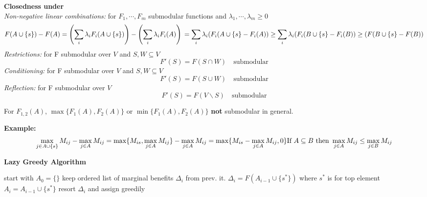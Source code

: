 \documentclass[10pt,parskip]{scrartcl}
\begin{document}
\begin{multicols*}{3}
\textbf{Closedness under}\\
\emph{Non-negative linear combinations: } for $F_1,\cdots,F_m$ submodular functions and $\lambda_1, \cdots, \lambda_m \geq 0$
\begingroup
    \fontsize{8pt}{8pt}\selectfont 
$$
F(A \cup \{ s \}) - F(A) = \left(\sum_i \lambda_i F_i(A \cup \{s\}) \right) - \left( \sum_i \lambda_i F_i(A)  \right) \\
 = \sum_i \lambda_i (F_i(A \cup \{s\} - F_i(A)) \geq \sum_i \lambda_i (F_i(B \cup \{s\} - F_i(B)) \\
\geq (F(B \cup \{s\} - F(B))
$$
\endgroup
\emph{Restrictions: } for F submodular over $V$ and $S,W \subseteq V$
$$
F'(S) = F(S \cap W) \quad \textrm{submodular}
$$
\emph{Conditioning: } for F submodular over $V$ and $S,W \subseteq V$
$$
F'(S) = F(S \cup W) \quad \textrm{submodular}
$$
\emph{Reflection: } for F submodular over $V$
$$
F'(S) = F(V \backslash S) \quad \textrm{submodular}
$$
\begin{mdframed}
	For $F_{1,2}(A)$, $\max \{F_1(A),F_2(A) \}$ or $\min \{F_1(A),F_2(A) \}$ \textbf{not} submodular in general.
\end{mdframed}

\textbf{Example: }
\begingroup
    \fontsize{8pt}{8pt}\selectfont 
$$
\max_{j\in A \cup \{s\}} M_{ij} - \max_{j\in A} M_{ij} = \max \{M_{is},\max_{j\in A} M_{ij} \} - \max_{j \in A} M_{ij} \\
= \max \{ M_{is} - \max_{j \in A} M_{ij}, 0 \} \\
\text{If } A \subseteq B \ \text{then} \ \max_{j \in A} M_{ij} \leq \max_{j \in B} M_{ij}
$$
\endgroup

\textbf{Lazy Greedy Algorithm}
	\begin{algorithmic}
		\State start with $A_0=\{\}$
		\State keep ordered list of marginal benefits $\Delta_i$ from prev. it.
			\State $\Delta_i = F(A_{i-1} \cup \{s^\ast\})$ where $s^\ast$ is for top element
				\State $A_i = A_{i-1} \cup \{s^\ast\}$
			\Else
				\State resort $\Delta_i$ and assign greedily
			\EndIf
		\EndFor
	\end{algorithmic}




\end{multicols*}
\end{document}
